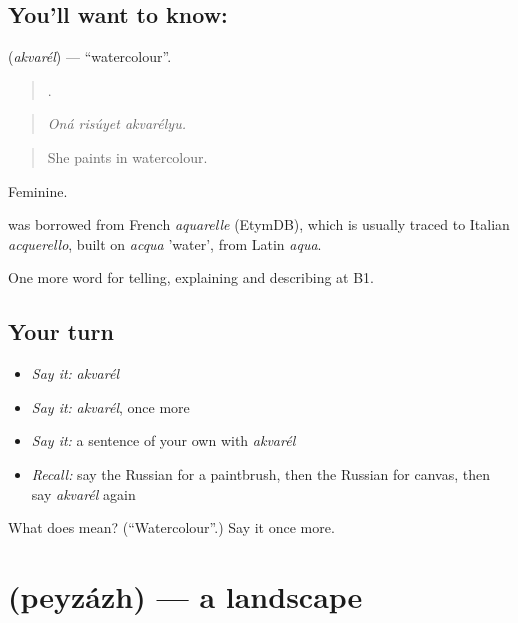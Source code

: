 \subsection*{You'll want to know: }
\textbf{} (\emph{akvarél}) — \textquotedblleft{}watercolour\textquotedblright{}.

\begin{quote}
  .
\end{quote}

\begin{quote}
\emph{Oná risúyet akvarélyu.}
\end{quote}

\begin{quote}
She paints in watercolour.
\end{quote}

Feminine.

\begin{cousinweb}
\emph{} was borrowed from French \emph{aquarelle} (EtymDB), which is usually traced to Italian \emph{acquerello}, built on \emph{acqua} 'water', from Latin \emph{aqua}.
\end{cousinweb}

\begin{grammarlens}[title={What you've built}]
One more word for telling, explaining and describing at B1.
\end{grammarlens}

\subsection*{Your turn}
\begin{itemize}
\raggedright
  \item \emph{Say it:} \emph{akvarél}
  \item \emph{Say it:} \emph{akvarél}, once more
  \item \emph{Say it:} a sentence of your own with \emph{akvarél}
  \item \emph{Recall:} say the Russian for a paintbrush, then the Russian for canvas, then say \emph{akvarél} again
\end{itemize}

\begin{tcolorbox}[breakable,colback=teal!4,colframe=teal!35!black,title={Before you move on}]
What does  mean? (\textquotedblleft{}Watercolour\textquotedblright{}.) Say it once more.
\end{tcolorbox}
\section[\texorpdfstring{\ru{пейзаж} (peyzázh)}{пейзаж (peyzázh)}]{ (peyzázh) — a landscape}

